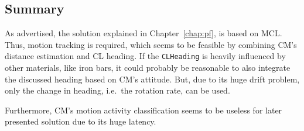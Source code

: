 \subsection{Summary}
As advertised, the solution explained in Chapter~\ref{chap:pf}, is based on \ac{MCL}. Thus, motion tracking is required, which seems to be feasible by combining \ac{CM}'s distance estimation and \ac{CL} heading. If the \texttt{CLHeading} is heavily influenced by other materials, like iron bars, it could probably be reasonable to also integrate the discussed heading based on \ac{CM}'s attitude. But, due to its huge drift problem, only the change in heading, i.e.\ the rotation rate, can be used.

Furthermore, \ac{CM}'s motion activity classification seems to be useless for later presented solution due to its huge latency.
